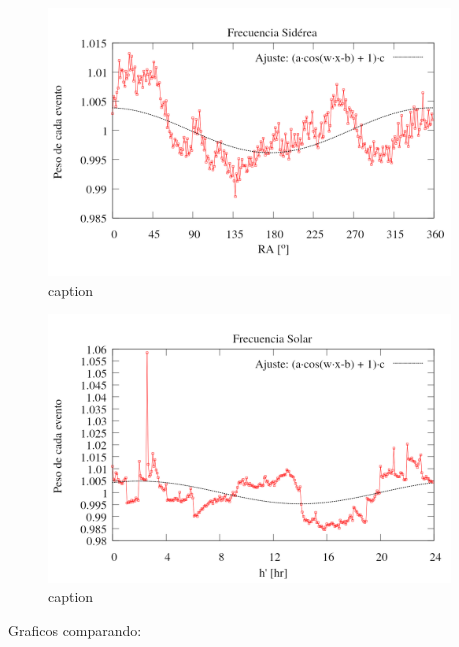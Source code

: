 		
		
		\begin{figure}[H]
			\centering
			\includegraphics[width=0.95\textwidth]{eventos_RA_ajuste_cos.png}
			\caption{caption}
		\end{figure}
		
		
		
		
		
		\begin{figure}[H]
			\centering
			\includegraphics[width=0.95\textwidth]{eventos_hora_local_ajuste_cos.png}
			\caption{caption}
		\end{figure}
		
		Graficos comparando:
		
